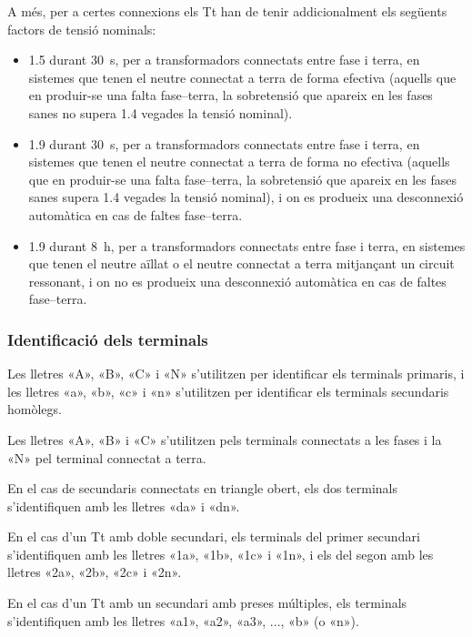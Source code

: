 A més, per a certes connexions els Tt han de tenir addicionalment els següents factors de tensió nominals:
 \begin{itemize}
   \item \num{1,5} durant \SI{30}{s},  per a transformadors connectats entre fase i terra, en sistemes que tenen el neutre connectat a terra de forma efectiva (aquells que en produir-se una falta fase--terra, la sobretensió que apareix en les fases sanes no supera \num{1,4} vegades la tensió nominal).
   \item \num{1,9} durant \SI{30}{s},  per a transformadors connectats entre fase i terra, en sistemes que tenen el neutre connectat a terra de forma no efectiva (aquells que en produir-se una falta fase--terra, la sobretensió que apareix en les fases sanes  supera \num{1,4} vegades la tensió nominal), i on es produeix una desconnexió automàtica  en cas de faltes fase--terra.
   \item \num{1,9} durant \SI{8}{h},  per a transformadors connectats entre fase i terra, en sistemes que tenen el neutre aïllat o el neutre connectat a terra mitjançant un circuit ressonant, i on no es produeix una desconnexió automàtica  en cas de faltes fase--terra.
\end{itemize}

\subsubsection{Identificació dels terminals}

 Les lletres «A», «B», «C» i «N» s'utilitzen per identificar els terminals primaris, i les lletres «a», «b», «c» i «n» s'utilitzen per identificar els terminals secundaris homòlegs.

 Les lletres «A», «B» i «C» s'utilitzen pels terminals connectats a les fases i la «N» pel terminal connectat a terra.

 En el cas de secundaris connectats en triangle obert, els dos terminals s'identifiquen amb les lletres «da» i «dn».

 En el cas d'un Tt amb doble secundari, els terminals del  primer secundari s'identifiquen amb les lletres  «1a», «1b», «1c» i «1n», i els del segon amb les lletres  «2a», «2b», «2c» i «2n».

 En el cas d'un Tt amb un  secundari amb preses múltiples, els terminals s'identifiquen amb les lletres  «a1», «a2», «a3», ..., «b» (o «n»).

